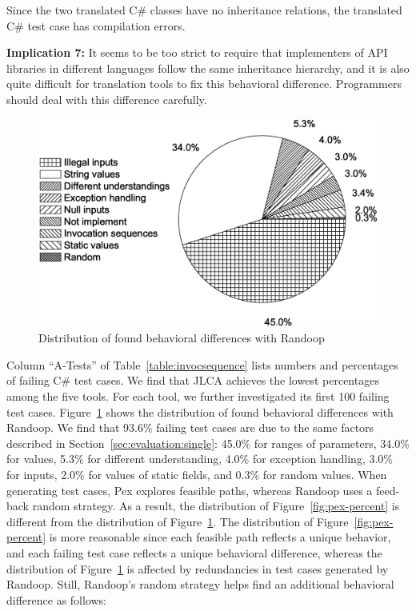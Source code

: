 Since the two translated C\# classes have no inheritance relations, the translated C\# test case has compilation errors.

\textbf{Implication 7:} It seems to be too strict to require that implementers of API libraries in different languages follow the same inheritance hierarchy, and it is also quite difficult for translation tools to fix this behavioral difference. Programmers should deal with this difference carefully.
\begin{figure}[t]
\centering
\includegraphics[scale=0.32,clip]{figure/randoop-percent.eps}\vspace*{-2ex}
 \caption{Distribution of found behavioral differences with Randoop}\vspace*{-4ex}
 \label{fig:randoop-percent}
\end{figure}


Column ``A-Tests'' of Table~\ref{table:invocsequence} lists numbers and percentages of failing C\# test cases. We find that JLCA achieves the lowest percentages among the five tools. For each tool, we further investigated its first 100 failing test cases. Figure~\ref{fig:randoop-percent} shows the distribution of found behavioral differences with Randoop. We find that 93.6\% failing test cases are due to the same factors described in Section~\ref{sec:evaluation:single}: 45.0\% for ranges of parameters, 34.0\% for  values, 5.3\% for different understanding, 4.0\% for exception handling, 3.0\% for  inputs, 2.0\% for values of static fields, and 0.3\% for random values. When generating test cases, Pex explores feasible paths, whereas Randoop uses a feed-back random strategy. As a result, the distribution of Figure~\ref{fig:pex-percent} is different from the distribution of Figure~\ref{fig:randoop-percent}. The distribution of Figure~\ref{fig:pex-percent} is more reasonable since each feasible path reflects a unique behavior, and each failing test case reflects a unique behavioral difference, whereas the distribution of Figure~\ref{fig:randoop-percent} is affected by redundancies in test cases generated by Randoop. Still, Randoop's random strategy helps find an additional behavioral difference as follows:

